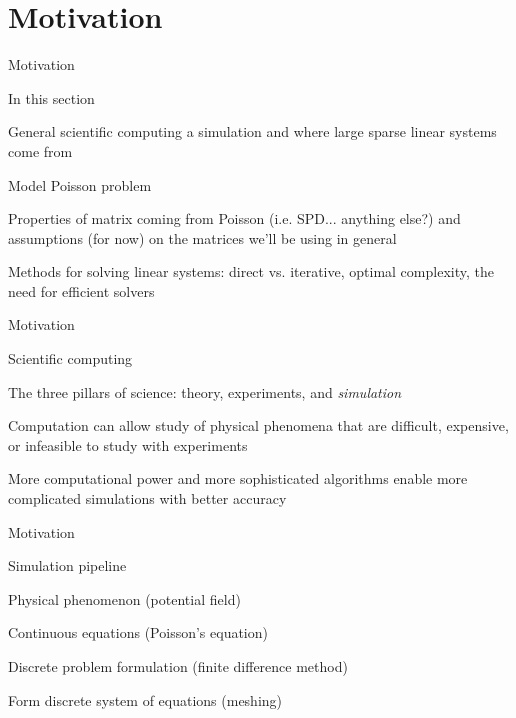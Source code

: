 \documentclass[18pt,xcolor=table]{beamer}
\begin{document}

\section{Motivation}

\begin{frame}{Motivation}
\begin{block}{In this section}
\bit
\item General scientific computing a simulation and where large sparse linear systems come from
\item Model Poisson problem
\item Properties of matrix coming from Poisson (i.e. SPD... anything else?) and assumptions (for now) on the matrices we'll be using in general
\item Methods for solving linear systems: direct vs. iterative, optimal complexity, the need for efficient solvers
\eit
\end{block}
\end{frame}

\begin{frame}{Motivation}
\begin{block}{Scientific computing}
\bit
\item The three pillars of science: theory, experiments, and \emph{simulation}
\item Computation can allow study of physical phenomena that are difficult, expensive, or infeasible to study with experiments
\item More computational power and more sophisticated algorithms enable more complicated simulations with better accuracy
\eit
\end{block}
\end{frame}

\begin{frame}{Motivation}
\begin{block}{Simulation pipeline}
\bit
\item Physical phenomenon (potential field)
\item Continuous equations (Poisson's equation)
\item Discrete problem formulation (finite difference method)
\item Form discrete system of equations (meshing)
\eit
\end{block}
\end{frame}
\end{document}
